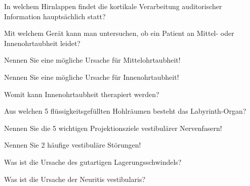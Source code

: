 \documentclass[10pt, a4paper]{exam}
\begin{document}
\begin{questions}
\begin{solution}
  \end{solution}

  \question In welchem Hirnlappen findet die kortikale Verarbeitung auditorischer Information hauptsächlich statt?
  \begin{solution}

  \end{solution}

  \question Mit welchem Gerät kann man untersuchen, ob ein Patient an Mittel- oder Innenohrtaubheit leidet?
  \begin{solution}

  \end{solution}

  \question Nennen Sie eine mögliche Ursache für Mittelohrtaubheit!
  \begin{solution}

  \end{solution}

  \question Nennen Sie eine mögliche Ursache für Innenohrtaubheit!
  \begin{solution}

  \end{solution}

  \question Womit kann Innenohrtaubheit therapiert werden?
  \begin{solution}

  \end{solution}

  \question Aus welchen 5 flüssigkeitsgefüllten Hohlräumen besteht das Labyrinth-Organ?
  \begin{solution}

  \end{solution}

  \question Nennen Sie die 5 wichtigen Projektionsziele vestibulärer Nervenfasern!
  \begin{solution}

  \end{solution}

  \question Nennen Sie 2 häufige vestibuläre Störungen!
  \begin{solution}

  \end{solution}

  \question Was ist die Ursache des gutartigen Lagerungsschwindels?
  \begin{solution}

  \end{solution}

  \question Was ist die Ursache der Neuritis vestibularis?
  \begin{solution}


\end{solution}
\end{questions}
\end{document}
